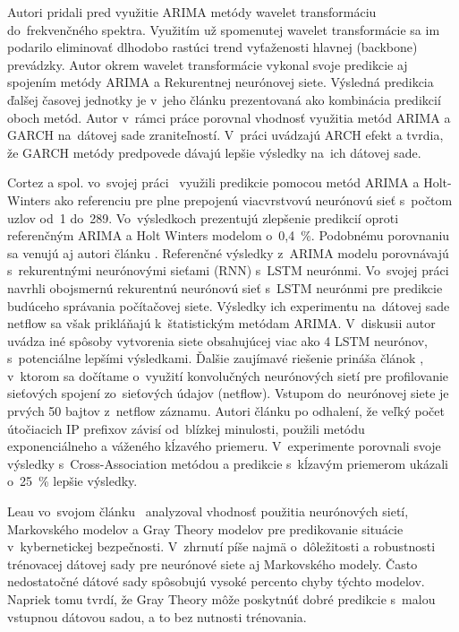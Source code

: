 \documentclass[thesismargins, thesislinespacing, openright, upjsfrontpage]{rnthesis}
\begin{document}
Autori \cite{madan2018predicting,papagiannaki2005long} pridali pred využitie ARIMA metódy wavelet transformáciu~\cite{torrence1998practical} do~frekvenčného spektra. Využitím už spomenutej wavelet transformácie sa im podarilo eliminovať dlhodobo rastúci trend vyťaženosti hlavnej (backbone) prevádzky. Autor \cite{madan2018predicting} okrem wavelet transformácie vykonal svoje predikcie aj spojením metódy ARIMA a Rekurentnej neurónovej siete. Výsledná predikcia ďalšej časovej jednotky je v~jeho článku prezentovaná ako kombinácia predikcií oboch metód. Autor v~rámci práce \cite{tang2016exploiting} porovnal vhodnosť využitia metód ARIMA a GARCH na~dátovej sade zraniteľností. V~práci uvádzajú ARCH efekt a tvrdia, že GARCH metódy predpovede dávajú lepšie výsledky na~ich dátovej sade.

Cortez a spol. vo~svojej práci~\cite{cortez2012multi} využili predikcie pomocou metód ARIMA a Holt-Winters ako referenciu pre plne prepojenú viacvrstvovú neurónovú sieť s~počtom uzlov od~1 do~289. Vo~výsledkoch prezentujú zlepšenie predikcií oproti referenčným ARIMA a Holt Winters modelom o~0,4~\%. Podobnému porovnaniu sa venujú aj autori článku \cite{fang2019deep}. Referenčné výsledky z~ARIMA modelu porovnávajú s~rekurentnými neurónovými sieťami (RNN) s~LSTM neurónmi. Vo~svojej práci navrhli obojsmernú rekurentnú neurónovú sieť s~LSTM neurónmi pre predikcie budúceho správania počítačovej siete. Výsledky ich experimentu na~dátovej sade netflow sa však prikláňajú k~štatistickým metódam ARIMA. V~diskusii autor uvádza iné spôsoby vytvorenia siete obsahujúcej viac ako 4 LSTM neurónov, s~potenciálne lepšími výsledkami. Ďalšie zaujímavé riešenie prináša článok \cite{millar2019using}, v~ktorom sa dočítame o~využití konvolučných neurónových sietí pre profilovanie sieťových spojení zo~sieťových údajov (netflow). Vstupom do~neurónovej siete je prvých 50 bajtov z~netflow záznamu. Autori článku \cite{soldo2011blacklisting} po odhalení, že veľký počet útočiacich IP prefixov závisí od~blízkej minulosti, použili metódu exponenciálneho a váženého kĺzavého priemeru. V~experimente porovnali svoje výsledky s~Cross-Association metódou a predikcie s~kĺzavým priemerom ukázali o~25~\% lepšie výsledky.

Leau vo~svojom článku~\cite{Leau2015} analyzoval vhodnosť použitia neurónových sietí, Markovského modelov a Gray Theory modelov pre predikovanie situácie v~kybernetickej bezpečnosti. V~zhrnutí píše najmä o~dôležitosti a robustnosti trénovacej dátovej sady pre neurónové siete aj Markovského modely. Často nedostatočné dátové sady spôsobujú vysoké percento chyby týchto modelov. Napriek tomu tvrdí, že Gray Theory môže poskytnúť dobré predikcie s~malou vstupnou dátovou sadou, a to bez nutnosti trénovania.
\end{document}
